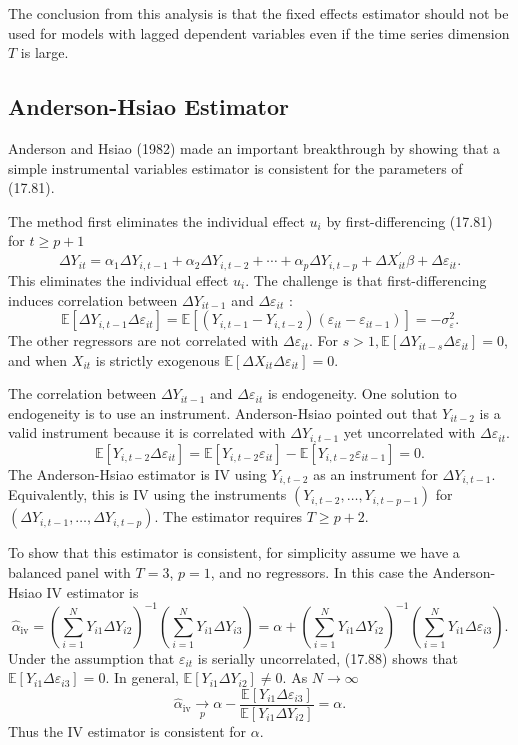 \documentclass[10pt]{article}
\begin{document}
The conclusion from this analysis is that the fixed effects estimator should not be used for models with lagged dependent variables even if the time series dimension $T$ is large.

\subsection{Anderson-Hsiao Estimator}
Anderson and Hsiao (1982) made an important breakthrough by showing that a simple instrumental variables estimator is consistent for the parameters of (17.81).

The method first eliminates the individual effect $u_{i}$ by first-differencing (17.81) for $t \geq p+1$
$$
\Delta Y_{i t}=\alpha_{1} \Delta Y_{i, t-1}+\alpha_{2} \Delta Y_{i, t-2}+\cdots+\alpha_{p} \Delta Y_{i, t-p}+\Delta X_{i t}^{\prime} \beta+\Delta \varepsilon_{i t} .
$$
This eliminates the individual effect $u_{i}$. The challenge is that first-differencing induces correlation between $\Delta Y_{i t-1}$ and $\Delta \varepsilon_{i t}$ :
$$
\mathbb{E}\left[\Delta Y_{i, t-1} \Delta \varepsilon_{i t}\right]=\mathbb{E}\left[\left(Y_{i, t-1}-Y_{i, t-2}\right)\left(\varepsilon_{i t}-\varepsilon_{i t-1}\right)\right]=-\sigma_{\varepsilon}^{2} .
$$
The other regressors are not correlated with $\Delta \varepsilon_{i t}$. For $s>1, \mathbb{E}\left[\Delta Y_{i t-s} \Delta \varepsilon_{i t}\right]=0$, and when $X_{i t}$ is strictly exogenous $\mathbb{E}\left[\Delta X_{i t} \Delta \varepsilon_{i t}\right]=0$.

The correlation between $\Delta Y_{i t-1}$ and $\Delta \varepsilon_{i t}$ is endogeneity. One solution to endogeneity is to use an instrument. Anderson-Hsiao pointed out that $Y_{i t-2}$ is a valid instrument because it is correlated with $\Delta Y_{i, t-1}$ yet uncorrelated with $\Delta \varepsilon_{i t}$.
$$
\mathbb{E}\left[Y_{i, t-2} \Delta \varepsilon_{i t}\right]=\mathbb{E}\left[Y_{i, t-2} \varepsilon_{i t}\right]-\mathbb{E}\left[Y_{i, t-2} \varepsilon_{i t-1}\right]=0 .
$$
The Anderson-Hsiao estimator is IV using $Y_{i, t-2}$ as an instrument for $\Delta Y_{i, t-1}$. Equivalently, this is IV using the instruments $\left(Y_{i, t-2}, \ldots, Y_{i, t-p-1}\right)$ for $\left(\Delta Y_{i, t-1}, \ldots, \Delta Y_{i, t-p}\right)$. The estimator requires $T \geq p+2$.

To show that this estimator is consistent, for simplicity assume we have a balanced panel with $T=3$, $p=1$, and no regressors. In this case the Anderson-Hsiao IV estimator is
$$
\widehat{\alpha}_{\mathrm{iv}}=\left(\sum_{i=1}^{N} Y_{i 1} \Delta Y_{i 2}\right)^{-1}\left(\sum_{i=1}^{N} Y_{i 1} \Delta Y_{i 3}\right)=\alpha+\left(\sum_{i=1}^{N} Y_{i 1} \Delta Y_{i 2}\right)^{-1}\left(\sum_{i=1}^{N} Y_{i 1} \Delta \varepsilon_{i 3}\right) .
$$
Under the assumption that $\varepsilon_{i t}$ is serially uncorrelated, (17.88) shows that $\mathbb{E}\left[Y_{i 1} \Delta \varepsilon_{i 3}\right]=0$. In general, $\mathbb{E}\left[Y_{i 1} \Delta Y_{i 2}\right] \neq 0$. As $N \rightarrow \infty$
$$
\widehat{\alpha}_{\mathrm{iv}} \underset{p}{\longrightarrow} \alpha-\frac{\mathbb{E}\left[Y_{i 1} \Delta \varepsilon_{i 3}\right]}{\mathbb{E}\left[Y_{i 1} \Delta Y_{i 2}\right]}=\alpha .
$$
Thus the IV estimator is consistent for $\alpha$.
\end{document}
